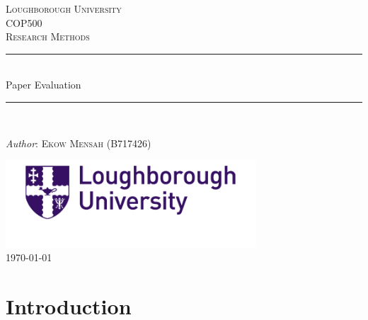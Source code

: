 \documentclass[a4paper, 12pt]{article}
\begin{document}
\begin{titlepage}

 \newcommand{\HRule}{\rule{\linewidth}{0.5mm}}
 
 \center %
 
 \textsc{\LARGE Loughborough University}\\[1.5cm]
 
 \textsc{\Large COP500}\\[0.5cm]
 
 \textsc{\large Research Methods}\\[0.5cm]
 
\HRule\\[0.4cm]

 {\huge Paper Evaluation}\\[0.4cm]

\HRule\\[1.5cm]

\begin{minipage}{0.4\textwidth}
 \begin{center}
   \large
   \textit{Author}: \textsc{Ekow Mensah (B717426)}
 \end{center}
 \end{minipage}

\vfill\vfill

\includegraphics[width=0.7\textwidth]{logo.png}\\[1cm]

\vfill\vfill\vfill
{\large\today}

 
\end{titlepage}
 
\newpage

\section{Introduction}

\onehalfspacing
\end{document}
